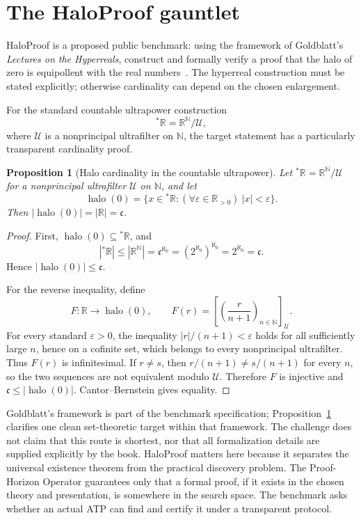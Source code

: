 \documentclass[11pt,oneside]{book}
\newtheorem{proposition}[theorem]{Proposition}
\theoremstyle{definition}
\theoremstyle{remark}
\newcommand{\N}{\mathbb{N}}
\newcommand{\R}{\mathbb{R}}
\newcommand{\cC}{\mathfrak{c}}
\newcommand{\halo}{\operatorname{halo}}
\begin{document}
\section{The HaloProof gauntlet}
HaloProof is a proposed public benchmark: using the framework of Goldblatt's \emph{Lectures on the Hyperreals}, construct and formally verify a proof that the halo of zero is equipollent with the real numbers~\cite{goldblatt1998,tennesonHalo}. The hyperreal construction must be stated explicitly; otherwise cardinality can depend on the chosen enlargement.

For the standard countable ultrapower construction
\[
{}^*\R=\R^{\N}/\mathcal U,
\]
where $\mathcal U$ is a nonprincipal ultrafilter on $\N$, the target statement has a particularly transparent cardinality proof.

\begin{proposition}[Halo cardinality in the countable ultrapower]\label{prop:halo}
Let ${}^*\R=\R^{\N}/\mathcal U$ for a nonprincipal ultrafilter $\mathcal U$ on $\N$, and let
\[
\halo(0)=\{x\in{}^*\R:(\forall \varepsilon\in\R_{>0})\ |x|<\varepsilon\}.
\]
Then $|\halo(0)|=|\R|=\cC$.
\end{proposition}
\begin{proof}
First, $\halo(0)\subseteq{}^*\R$, and
\[
|{}^*\R|\le |\R^{\N}|=\cC^{\aleph_0}=(2^{\aleph_0})^{\aleph_0}=2^{\aleph_0}=\cC.
\]
Hence $|\halo(0)|\le\cC$.

For the reverse inequality, define
\[
F:\R\longrightarrow\halo(0),
\qquad
F(r)=\left[\left(\frac{r}{n+1}\right)_{n\in\N}\right]_{\mathcal U}.
\]
For every standard $\varepsilon>0$, the inequality $|r|/(n+1)<\varepsilon$ holds for all sufficiently large $n$, hence on a cofinite set, which belongs to every nonprincipal ultrafilter. Thus $F(r)$ is infinitesimal. If $r\ne s$, then $r/(n+1)\ne s/(n+1)$ for every $n$, so the two sequences are not equivalent modulo $\mathcal U$. Therefore $F$ is injective and $\cC\le|\halo(0)|$. Cantor--Bernstein gives equality.
\end{proof}

Goldblatt's framework is part of the benchmark specification; Proposition~\ref{prop:halo} clarifies one clean set-theoretic target within that framework. The challenge does not claim that this route is shortest, nor that all formalization details are supplied explicitly by the book. HaloProof matters here because it separates the universal existence theorem from the practical discovery problem. The Proof-Horizon Operator guarantees only that a formal proof, if it exists in the chosen theory and presentation, is somewhere in the search space. The benchmark asks whether an actual ATP can find and certify it under a transparent protocol.
\end{document}

